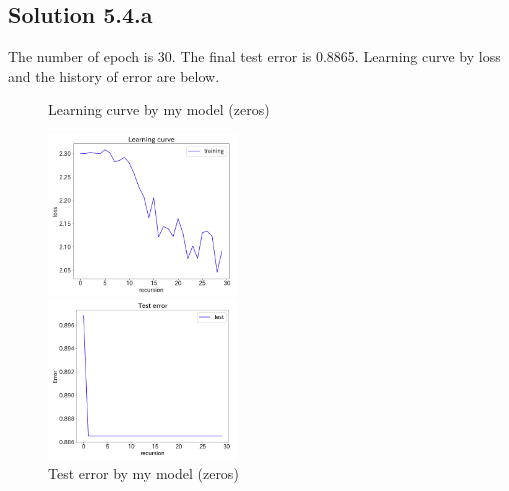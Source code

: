 \documentclass[a4paper]{article}
\theoremstyle{definition}
\newenvironment{soln}{
	\leavevmode\color{blue}\ignorespaces
}{}
\begin{document}
	\subsection*{Solution 5.4.a}	
	\begin{soln}
	The number of epoch is 30. The final test error is 0.8865. Learning curve by loss and the history of error are below.
\begin{figure}[htbp]
\begin{minipage}{0.5\hsize}
\begin{center}
\caption{Learning curve by my model (zeros) }
\includegraphics[width=50mm]{./img/my_lc_a.png}
\end{center}
\captionsetup{labelformat=empty}
\end{minipage}
\begin{minipage}{0.5\hsize}
\begin{center}
\caption{Test error by my model (zeros) }
\includegraphics[width=50mm]{./img/my_er_a.png}
\end{center}
\captionsetup{labelformat=empty}
\end{minipage}
\end{figure}
	\end{soln}
\end{document}
